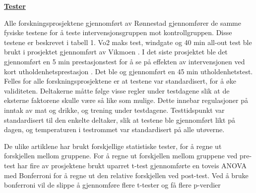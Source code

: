 \documentclass[
]{book}
\begin{document}
\underline{\textbf{Tester}}

Alle forskningsprosjektene gjennomført av Rønnestad \citep{rønnestad2010a, rønnestad2010b, rønnestad2015} gjennomfører de samme fysiske testene for å teste intervensjonsgruppen mot kontrollgruppen. Disse testene er beskrevet i tabell 1. Vo2 maks test, windgate og 40 min all-out test ble brukt i prosjektet gjennomført av Vikmoen \citep{vikmoen2016}. I det siste prosjektet ble det gjennomført en 5 min prestasjonstest for å se på effekten av intervensjonen ved kort utholdenhetsprestasjon \citep{aagaard2011}. Det ble og gjennomført en 45 min utholdenhetstest. Felles for alle forskningsprosjektene er at testene var standardisert, for å øke validiteten. Deltakerne måtte følge visse regler under testdagene slik at de eksterne faktorene skulle være så like som mulige. Dette innebar regulasjoner på inntak av mat og drikke, og trening under testdagene. Testtidspunkt var standardisert til den enkelte deltaker, slik at testene ble gjennomført likt på dagen, og temperaturen i testrommet var standardisert på alle utøverne.

De ulike artiklene har brukt forskjellige statistiske tester, for å regne ut forskjellen mellom gruppene. For å regne ut forskjellen mellom gruppene ved pre-test har fire av prosjektene brukt uparret t-test \citetext{\citealp{rønnestad2010a}; \citealp{rønnestad2010b}; \citealp{rønnestad2015}; \citealp[. En t-test blir brukt for å regne ut om det er signifikant forskjell mellom gjennomsnittet til to grupper. I disse studiene er t-testen brukt på to uavhengige grupper, som gjør at man må bruke en uparet t-test \citet{kim2015} . I motsetning til de andre har Aagaard \[@aagaard2011\] gjennomført en ikke parametisk ANOVA analyse for å regne ut forskjellen mellom gruppene ved pre-test. Ikke parametiske analyser brukes for å sammenligne data som ikke møter standarden for nomralditrubisjon, eller for mindre grupper som Aagaard har (n=14) \[@altman2009\]. Enveis ANOVA er en variasjonsanalyse som regner ut forskjellen i gjennomsnitt mellom to ulike grupper grupper. Hvis dette gir en p-verdi som er lavere enn det gitte signifikans nivået kan man konkludere med at det er forskjell mellom gruppene, men man kan ikke si hvilken forskjell det er. For å finne denne må man gjennomføre en post hoc test for å finne hvilke grupper som er ulike (kilde). For å regne ut den relative forskjellen mellom intervensjonsgruppen og kontrollgruppen har Aagard også brukt en ikke-parametisk ANOVA med post hoc. Vikmoen \[@vikmoen2016\] og Rønnestad \[@rønnestad2015\] brukte uparet t-test for å regne ut relativ forskjell mellom gruppene. Rønnestad {[}\citet{rønnestad2010a}]{vikmoen2016}; \citealp{rønnestad2010b}} gjennomførte en toveis ANOVA med Bonferroni for å regne ut den relative forskjellen ved post-test. Ved å bruke bonferroni vil de slippe å gjennomføre flere t-tester og få flere p-verdier
\end{document}
